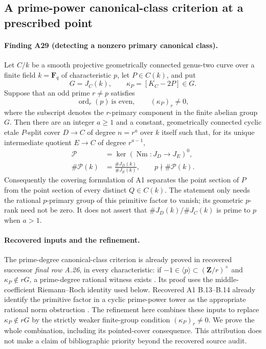\subsection{A prime-power canonical-class criterion at a prescribed point}
\label{sec:prime-power-canonical}

\paragraph{Finding A29 (detecting a nonzero primary canonical class).}
Let $C/k$ be a smooth projective geometrically connected genus-two
curve over a finite field $k=\mathbf F_q$ of characteristic $p$, let
$P\in C(k)$, and put
\[
 G=J_C(k),\qquad \kappa_P=[K_C-2P]\in G.
 \tag{PC.1}
\]
Suppose that an odd prime $r\ne p$ satisfies
\[
 \operatorname{ord}_r(p)\ \text{is even},\qquad
 (\kappa_P)_r\ne0,
 \tag{PC.2}
\]
where the subscript denotes the $r$-primary component in the finite
abelian group $G$. Then there are an integer $a\ge1$ and a constant,
geometrically connected cyclic etale $P$-split cover
$D\to C$ of degree $n=r^a$ over $k$ itself such that, for its unique
intermediate quotient $E\to C$ of degree $r^{a-1}$,
\[
 \begin{aligned}
 \mathcal P&=\ker(\operatorname{Nm}:J_D\longrightarrow J_E)^0,\\
 \#\mathcal P(k)&=\frac{\#J_D(k)}{\#J_E(k)},
 \qquad p\nmid\#\mathcal P(k).
 \end{aligned}
 \tag{PC.3}
\]
Consequently the covering formulation of A1 separates the point
section of $P$ from the point section of every distinct $Q\in C(k)$.
The statement only needs the rational $p$-primary group of this
primitive factor to vanish; its geometric $p$-rank need not be zero.
It does not assert that $\#J_D(k)/\#J_C(k)$ is prime to $p$ when
$a>1$.

\paragraph{Recovered inputs and the refinement.}
The prime-degree canonical-class criterion is already proved in
recovered successor \emph{final row A.26}, in every characteristic:
if $-1\in\langle p\rangle\subset(\mathbf Z/r)^\times$ and
$\kappa_P\notin rG$, a prime-degree rational witness exists
\cite[A.26]{ASrun}. Its proof uses the middle-coefficient
Riemann--Roch identity used below. Recovered A1 B.13--B.14 already
identify the primitive factor in a cyclic prime-power tower as the
appropriate rational norm obstruction \cite[B.13--B.14]{A1run}.
The refinement here combines these inputs to replace
$\kappa_P\notin rG$ by the strictly weaker finite-group condition
$(\kappa_P)_r\ne0$. We prove the whole combination, including
its pointed-cover consequence. This attribution does not make a
claim of bibliographic priority beyond the recovered source audit.

